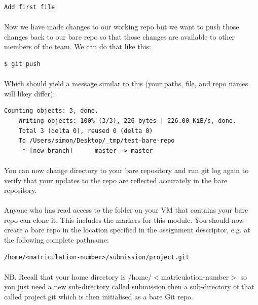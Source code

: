 \documentclass[12pt, a4paper, oneside]{book}
\begin{document}
{\begin{lstlisting}[style=DOS]
        Add first file
\end{lstlisting}

\paragraph{} Now we have made changes to our working repo but we want to push those changes back to our bare repo so that those changes are available to other members of the team. We can do that like this:

\begin{lstlisting}[style=DOS]
    $ git push
\end{lstlisting}

\paragraph{} Which should yield a message similar to this (your paths, file, and repo names will likey differ):

\begin{lstlisting}[style=DOS]
    Counting objects: 3, done.
    Writing objects: 100% (3/3), 226 bytes | 226.00 KiB/s, done.
    Total 3 (delta 0), reused 0 (delta 0)
    To /Users/simon/Desktop/_tmp/test-bare-repo
     * [new branch]      master -> master
\end{lstlisting}

\paragraph{} You can now change directory to your bare repository and run git log again to verify that your updates to the repo are reflected accurately in the bare repository.

\paragraph{} Anyone who has read access to the folder on your VM that contains your bare repo can clone it. This includes the markers for this module. You should now create a bare repo in the location specified in the assignment descriptor, e.g. at the following complete pathname:

\begin{lstlisting}[style=DOS]
    /home/<matriculation-number>/submission/project.git
\end{lstlisting}

\paragraph{} NB. Recall that your home directory is /home/$<$matriculation-number$>$ so you just need a new sub-directory called submission then a sub-directory of that called project.git which is then initialised as a bare Git repo.

}
\end{document}
